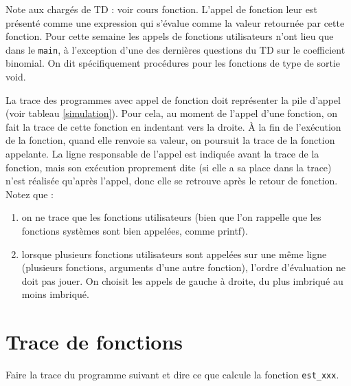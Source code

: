 
\newcommand{\commentaire}[1]{}



\begin{correction}
  Note aux chargés de TD : voir cours fonction. L'appel de fonction
  leur est présenté comme une expression qui s'évalue comme la valeur
  retournée par cette fonction.  Pour cette semaine les appels de
  fonctions utilisateurs n'ont lieu que dans le \verb+main+, à
  l'exception d'une des dernières questions du TD sur le coefficient
  binomial. On dit spécifiquement procédures pour les
  fonctions de type de sortie void.
  
  La trace des programmes avec appel de fonction doit représenter la
  pile d'appel (voir tableau \ref{simulation}). Pour cela, au moment
  de l'appel d'une fonction, on fait la trace de cette fonction en
  indentant vers la droite. À la fin de l'exécution de la fonction,
  quand elle renvoie sa valeur, on poursuit la trace de la fonction
  appelante. La ligne responsable de l'appel est indiquée avant la
  trace de la fonction, mais son exécution proprement dite (si elle a
  sa place dans la trace) n'est réalisée qu'après l'appel, donc elle
  se retrouve après le retour de fonction. Notez que :
\begin{enumerate}
\item on ne trace que les fonctions utilisateurs (bien que l'on
  rappelle que les fonctions systèmes sont bien appelées, comme
  printf).
\item lorsque plusieurs fonctions utilisateurs sont appelées sur une
  même ligne (plusieurs fonctions, arguments d'une autre fonction),
  l'ordre d'évaluation ne doit pas jouer. On choisit les appels de
  gauche à droite, du plus imbriqué au moins imbriqué.
  \end{enumerate}
\end{correction}

\section{Trace de fonctions}

Faire la trace du programme suivant et dire ce que calcule la fonction \verb+est_xxx+.

{
\footnotesize
}


